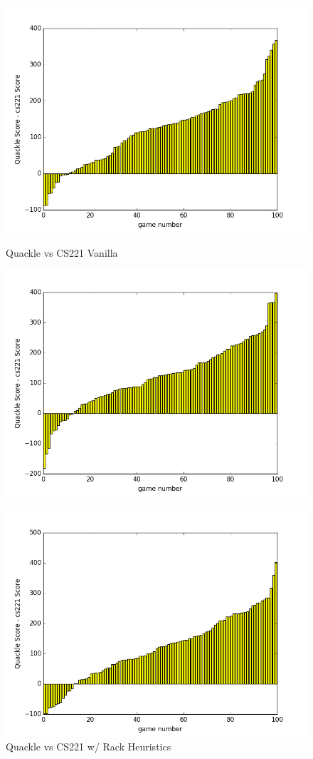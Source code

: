 \documentclass[12pt]{article}
\begin{document}
\begin{figure}[h!]
    \centering
  \includegraphics[scale=0.4]{../images/quacklegame_vanilla_100}
  \caption{\footnotesize{Quackle vs CS221 Vanilla}}
  \endminipage
      \centering
  \includegraphics[scale=0.4]{../images/quacklegame_rackH_100}\\
   \caption{\footnotesize{Quackle vs CS221 w/ Rack Heuristics}}
  \endminipage{}
    \centering
  \includegraphics[scale=0.4]{../images/quacklegame_MC_100}

\end{figure}
\end{document}
